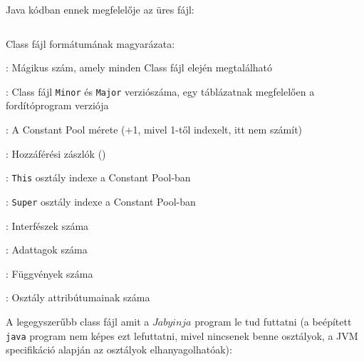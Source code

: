 Java kódban ennek megfelelője az üres fájl:
\begin{verbatim}
\end{verbatim}

Class fájl formátumának magyarázata:

\begin{compactitem}
\setlength\itemsep{-5px}
\item {}: Mágikus szám, amely minden Class fájl elején megtalálható
\item {} : Class fájl \lstinline{Minor} és \lstinline{Major} verziószáma, egy táblázatnak megfelelően a fordítóprogram verziója
\item {}: A Constant Pool mérete (+1, mivel 1-től indexelt, itt nem számít)
\item {}: Hozzáférési zászlók ()
\item {}: \lstinline{This} osztály indexe a Constant Pool-ban
\item {}: \lstinline{Super} osztály indexe a Constant Pool-ban
\item {}: Interfészek száma
\item {}: Adattagok száma
\item {}: Függvények száma
\item {}: Osztály attribútumainak száma
\end{compactitem}

\pagebreak

A legegyszerűbb class fájl amit a $Jabyinja$ program le tud futtatni (a beépített \lstinline{java} program nem képes ezt lefuttatni, mivel nincsenek benne osztályok, a JVM specifikáció alapján az osztályok elhanyagolhatóak):

